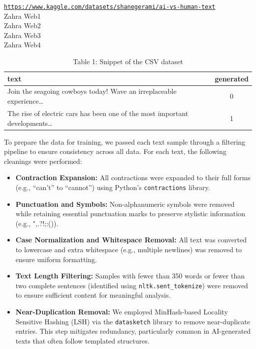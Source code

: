\documentclass{article} %
\begin{document}
\begin{table}[H]
\caption{Table 1: Snippet of the CSV dataset}

\begin{flushleft}
\href{https://www.kaggle.com/datasets/shanegerami/ai-vs-human-text}{\texttt{https://www.kaggle.com/datasets/shanegerami/ai-vs-human-text}}\\
Zahra Web1\\
Zahra Web2\\
Zahra Web3\\
Zahra Web4
\end{flushleft}

\vspace{0.5em}

\begin{tabular}{|p{10cm}|c|}
\hline
\textbf{text} & \textbf{generated} \\
\hline
Join the seagoing cowboys today! Wave an irreplaceable experience\ldots & 0 \\
\hline
The rise of electric cars has been one of the most important developments\ldots & 1 \\
\hline
\end{tabular}
\end{table}

To prepare the data for training, we passed each text sample through a filtering pipeline to ensure consistency across all data. For each text, the following cleanings were performed:
\begin{itemize}
    \item \textbf{Contraction Expansion:} All contractions were expanded to their full forms (e.g., ``can't'' to ``cannot'') using Python's \texttt{contractions} library.

    \item \textbf{Punctuation and Symbols:} Non-alphanumeric symbols were removed while retaining essential punctuation marks to preserve stylistic information (e.g., ",.?!;:()).

    \item \textbf{Case Normalization and Whitespace Removal:} All text was converted to lowercase and extra whitespace (e.g., multiple newlines) was removed to ensure uniform formatting.

    \item \textbf{Text Length Filtering:} Samples with fewer than 350 words or fewer than two complete sentences (identified using \texttt{nltk.sent\_tokenize}) were removed to ensure sufficient content for meaningful analysis.

    \item \textbf{Near-Duplication Removal:} We employed MinHash-based Locality Sensitive Hashing (LSH) via the \texttt{datasketch} library to remove near-duplicate entries. This step mitigates redundancy, particularly common in AI-generated texts that often follow templated structures.
\end{itemize}
\end{document}
